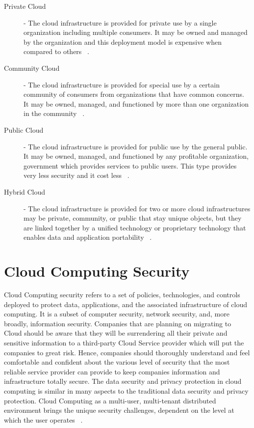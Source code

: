 \documentclass[sigconf]{acmart}
\begin{document}
\begin{description}


\item[Private Cloud]  - The cloud infrastructure is provided for private
use by a single organization including multiple consumers. It may be owned
and managed by the organization and this deployment model is expensive 
when compared to others ~\cite{hid-sp18-513-cloud3}.

\item[Community Cloud] - The cloud infrastructure is provided for special use
by a certain community of consumers from organizations that have  common 
concerns. It may be owned, managed, and functioned by more than one 
organization in the community ~\cite{hid-sp18-513-cloud3}.

\item[Public Cloud] - The cloud infrastructure is provided for public use by 
the general public. It may be owned, managed, and functioned by any  profitable 
organization, government which provides services to public users. This type 
provides very less security and it cost less ~\cite{hid-sp18-513-cloud3}.

\item[Hybrid Cloud] -  The cloud infrastructure is provided for two or more cloud 
infrastructures may be private, community, or public that stay unique  objects, 
but they are linked together by a unified technology or proprietary technology
that enables data and application portability ~\cite{hid-sp18-513-cloud3}.

  
\end{description}

\section{Cloud Computing Security}
Cloud Computing security refers to a set of policies, technologies, 
and controls deployed to protect data, applications, and the associated
infrastructure of cloud computing. It is a subset of computer security, 
network security, and, more broadly, information security. Companies that
are planning on migrating to Cloud should be aware that they will be 
surrendering all their private and sensitive information to a third-party
Cloud Service provider which will put the companies to great risk. Hence, 
companies should thoroughly understand and feel comfortable and confident
about the various level of security that the most reliable service provider
can provide to keep companies information and infrastructure 
totally secure.
The data security and privacy protection in cloud computing is similar in 
many aspects to the traditional data security and privacy protection. 
Cloud Computing as a multi-user, multi-tenant distributed environment brings 
the unique security challenges, dependent on the level at which
the user operates ~\cite{hid-sp18-513-zissis2012addressing}.
\end{document}
